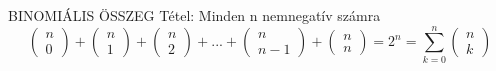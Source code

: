 \begin{framed}
BINOMIÁLIS ÖSSZEG Tétel: Minden n nemnegatív számra
$$\begin{pmatrix}
n\\0
\end{pmatrix} + \begin{pmatrix}
n\\1
\end{pmatrix} + \begin{pmatrix}
n\\2
\end{pmatrix} + ... + \begin{pmatrix}
n\\n-1
\end{pmatrix} + \begin{pmatrix}
n\\n
\end{pmatrix} = 2^n = \sum_{k = 0}^{n}\begin{pmatrix}
n\\k
\end{pmatrix}$$
\end{framed}
